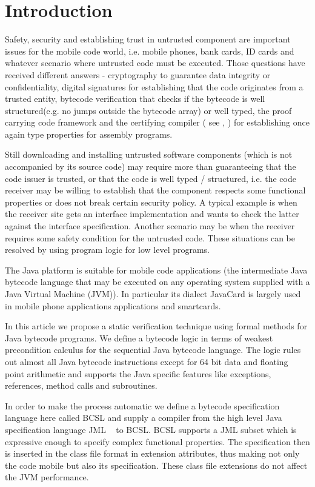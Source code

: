 
\section{Introduction}\label{intro}
Safety, security and establishing trust in untrusted component are important issues for the mobile code world, 
i.e. mobile phones, bank cards, ID cards and whatever scenario where 
untrusted code must be executed. Those questions have received different answers - cryptography to guarantee data integrity or confidentiality,
 digital signatures for establishing that the code originates from a trusted entity, bytecode verification that checks if the bytecode 
 is well structured(e.g. no jumps outside the bytecode array) or well typed, 
 the proof carrying code framework  and the certifying compiler ( see  \cite{ComNec},\cite{DesNecLee98} ) for establishing once 
 again type properties for assembly programs.  

Still downloading and installing untrusted software components (which is not accompanied by its source code) may require 
more than guaranteeing that the code issuer is trusted, or that the code is well typed / structured, i.e. the code receiver may be willing to establish that the component respects 
some functional properties or does not break certain security policy. 
A typical example is when the receiver site gets an interface implementation and wants to check the latter against the interface 
specification. Another scenario may be when the receiver requires some safety condition for the untrusted code.  These situations
can be resolved by using program logic for low level programs.

The Java platform is suitable for mobile code applications (the intermediate Java bytecode language that may be executed 
on any operating system supplied with a Java Virtual Machine (JVM)). In particular its dialect JavaCard is largely used in mobile phone applications 
applications and smartcards. 

In this article we propose a static verification technique using formal methods for Java bytecode programs.
We define a bytecode logic in terms of weakest precondition calculus for the sequential Java bytecode language. The logic rules out 
almost all Java bytecode instructions except for 64 bit data and floating point arithmetic and supports the Java specific features like 
exceptions, references, method calls and subroutines.  
 
 In order to make the process automatic we define a bytecode specification language here called BCSL and supply a compiler from 
 the high level Java specification language JML ~\cite{JMLRefMan} to BCSL. 
 BCSL supports a JML subset which is expressive enough to specify complex functional properties. The specification then is 
 inserted in the class file format in extension attributes, thus making not only the code mobile but also its specification. These class
 file extensions do not affect the JVM performance.

